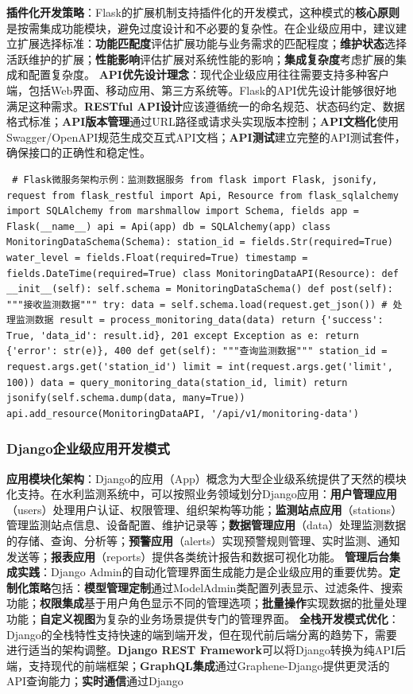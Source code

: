 \textbf{插件化开发策略}：Flask的扩展机制支持插件化的开发模式，这种模式的\textbf{核心原则}是按需集成功能模块，避免过度设计和不必要的复杂性。在企业级应用中，建议建立扩展选择标准：\textbf{功能匹配度}评估扩展功能与业务需求的匹配程度；\textbf{维护状态}选择活跃维护的扩展；\textbf{性能影响}评估扩展对系统性能的影响；\textbf{集成复杂度}考虑扩展的集成和配置复杂度。 \textbf{API优先设计理念}：现代企业级应用往往需要支持多种客户端，包括Web界面、移动应用、第三方系统等。Flask的API优先设计能够很好地满足这种需求。\textbf{RESTful API设计}应该遵循统一的命名规范、状态码约定、数据格式标准；\textbf{API版本管理}通过URL路径或请求头实现版本控制；\textbf{API文档化}使用Swagger/OpenAPI规范生成交互式API文档；\textbf{API测试}建立完整的API测试套件，确保接口的正确性和稳定性。 \begin{verbatim} # Flask微服务架构示例：监测数据服务 from flask import Flask, jsonify, request from flask_restful import Api, Resource from flask_sqlalchemy import SQLAlchemy from marshmallow import Schema, fields app = Flask(__name__) api = Api(app) db = SQLAlchemy(app) class MonitoringDataSchema(Schema): station_id = fields.Str(required=True) water_level = fields.Float(required=True) timestamp = fields.DateTime(required=True) class MonitoringDataAPI(Resource): def __init__(self): self.schema = MonitoringDataSchema() def post(self): """接收监测数据""" try: data = self.schema.load(request.get_json()) # 处理监测数据 result = process_monitoring_data(data) return {'success': True, 'data_id': result.id}, 201 except Exception as e: return {'error': str(e)}, 400 def get(self): """查询监测数据""" station_id = request.args.get('station_id') limit = int(request.args.get('limit', 100)) data = query_monitoring_data(station_id, limit) return jsonify(self.schema.dump(data, many=True)) api.add_resource(MonitoringDataAPI, '/api/v1/monitoring-data') \end{verbatim} \subsubsection{Django企业级应用开发模式}\label{djangoux4f01ux4e1aux7ea7ux5e94ux7528ux5f00ux53d1ux6a21ux5f0f} \textbf{应用模块化架构}：Django的应用（App）概念为大型企业级系统提供了天然的模块化支持。在水利监测系统中，可以按照业务领域划分Django应用：\textbf{用户管理应用}（users）处理用户认证、权限管理、组织架构等功能；\textbf{监测站点应用}（stations）管理监测站点信息、设备配置、维护记录等；\textbf{数据管理应用}（data）处理监测数据的存储、查询、分析等；\textbf{预警应用}（alerts）实现预警规则管理、实时监测、通知发送等；\textbf{报表应用}（reports）提供各类统计报告和数据可视化功能。 \textbf{管理后台集成实践}：Django Admin的自动化管理界面生成能力是企业级应用的重要优势。\textbf{定制化策略}包括：\textbf{模型管理定制}通过ModelAdmin类配置列表显示、过滤条件、搜索功能；\textbf{权限集成}基于用户角色显示不同的管理选项；\textbf{批量操作}实现数据的批量处理功能；\textbf{自定义视图}为复杂的业务场景提供专门的管理界面。 \textbf{全栈开发模式优化}：Django的全栈特性支持快速的端到端开发，但在现代前后端分离的趋势下，需要进行适当的架构调整。\textbf{Django REST Framework}可以将Django转换为纯API后端，支持现代的前端框架；\textbf{GraphQL集成}通过Graphene-Django提供更灵活的API查询能力；\textbf{实时通信}通过Django 